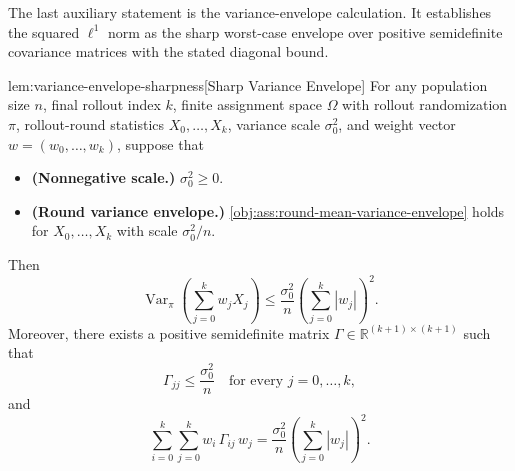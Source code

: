 \documentclass[11pt]{article}
\begin{document}
The last auxiliary statement is the variance-envelope calculation. It establishes the squared \(\ell^1\) norm as the sharp worst-case envelope over positive semidefinite covariance matrices with the stated diagonal bound.

\begin{lemmav}{lem:variance-envelope-sharpness}[Sharp Variance Envelope]
For any population size $n$, final rollout index $k$, finite assignment space $\Omega$ with rollout randomization $\pi$, rollout-round statistics $X_0,\ldots,X_k$, variance scale $\sigma_0^2$, and weight vector $w=(w_0,\ldots,w_k)$, suppose that
\begin{itemize}
\item \textbf{(Nonnegative scale.)} $\sigma_0^2\ge 0$.
\item \textbf{(Round variance envelope.)} \cref{obj:ass:round-mean-variance-envelope} holds for $X_0,\ldots,X_k$ with scale $\sigma_0^2/n$.
\end{itemize}
Then
\[
\operatorname{Var}_\pi\!\left(\sum_{j=0}^k w_j X_j\right)
\le
\frac{\sigma_0^2}{n}\left(\sum_{j=0}^k |w_j|\right)^2 .
\]
Moreover, there exists a positive semidefinite matrix
$\Gamma\in\mathbb R^{(k+1)\times(k+1)}$ such that
\[
\Gamma_{jj}\le \frac{\sigma_0^2}{n}\quad\text{for every }j=0,\ldots,k,
\]
and
\[
\sum_{i=0}^k\sum_{j=0}^k w_i\,\Gamma_{ij}\,w_j
=
\frac{\sigma_0^2}{n}\left(\sum_{j=0}^k |w_j|\right)^2 .
\]
\end{lemmav}
\end{document}
